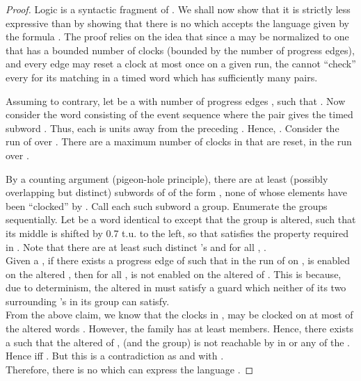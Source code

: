 \documentclass{llncs}
\newcommand{\potdta}{\mbox{}}
\newcommand{\mitlfpinf}{\mbox{}}
\newcommand{\mitlfpzinf}{\mbox{}}
\begin{document}
\begin{theorem}
\label{thm:fpexpress}
\mitlfpinf\/  \mitlfpzinf
\end{theorem}
\begin{proof}
Logic \mitlfpinf\/ is a syntactic fragment of \mitlfpzinf. We shall now show that it is strictly less expressive than \mitlfpzinf\/ by showing that there is no \potdta\/ which accepts the language given by the formula . The proof relies on the idea that since a \potdta\/ may be normalized to one that has a bounded number of clocks (bounded by the number of progress edges), and every edge may reset a clock at most once on a given run, the \potdta\/ cannot ``check'' every   for its matching  in a timed word which has sufficiently many  pairs.

Assuming to contrary, let  be a \potdta\/ with  number of progress edges , such that . Now consider the word  consisting of the event sequence  where the   pair gives the timed subword . Thus, each  is  units away from the preceding . Hence, . 
Consider the run of  over . 
There are a maximum number of  clocks in  that are reset, in the run over .

By a counting argument (pigeon-hole principle), there are at least  (possibly overlapping but distinct) subwords of  of the form , none of whose elements have been ``clocked'' by . Call each such subword a group. Enumerate the groups sequentially.
Let  be a word identical to  except that the  group is altered, such that its middle  is shifted by 0.7 t.u. to the left, so that  satisfies the property required in . Note that there are at least  such distinct 's and for all , . \\
Given a , if there exists a progress edge  of  such that in the run of  on ,  is enabled on the altered , then for all ,  is not enabled on the altered  of . This is because, due to determinism, the altered  in  must satisfy a guard which neither of its two surrounding 's in its group can satisfy. \\
From the above claim, we know that the  clocks in , may be clocked on at most  of the altered words . However, the family  has at least  members. Hence, there exists a  such that the altered  of , (and the  group) is not reachable 
by  in  or any of the . Hence  iff . But this is
a contradiction as  and  with . \\
Therefore, there is no \potdta\/ which can express the language .
\end{proof}
\end{document}
